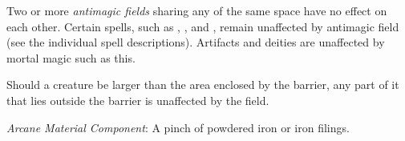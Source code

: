 {	Two or more \emph{antimagic fields} sharing any of the same space have no effect on each other. Certain spells, such as , , and , remain unaffected by antimagic field (see the individual spell descriptions). Artifacts and deities are unaffected by mortal magic such as this.

	Should a creature be larger than the area enclosed by the barrier, any part of it that lies outside the barrier is unaffected by the field.

	\textit{Arcane Material Component}:
	A pinch of powdered iron or iron filings.

}
